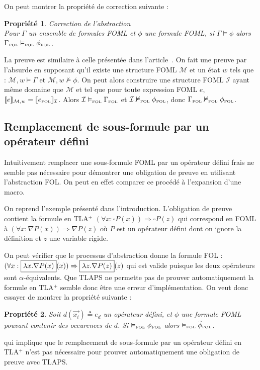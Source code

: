 \documentclass[12pt]{article}
\newcommand{\FOL}{\ensuremath{\textup{\tiny{}FOL}}}
\newcommand{\M}{\ensuremath{\mathcal{M}}}
\newcommand{\I}{\ensuremath{\mathcal{I}}}
\newcommand{\bpar}[1]{\marginpar{\color{myblue}\footnotesize\raggedright#1}}
\newtheorem{prop}{Propriété}
\begin{document}
On peut montrer la propriété de correction suivante :
\begin{prop} \emph{Correction de l'abstraction} \\
  Pour $\Gamma$ un ensemble de formules FOML et $\phi$ une formule FOML, si $\Gamma \vDash \phi$ alors $\Gamma_\FOL \vDash_\FOL \phi_\FOL$.
\end{prop}
La preuve est similaire à celle présentée dans l'article~\cite{ARQNL2014}.
On fait une preuve par l'absurde en supposant qu'il existe une structure FOML $\M$ et un état $w$ tels que :
$\M, w \vDash \Gamma$ et $\M, w \nvDash \phi$.
On peut alors construire une structure FOML $\I$ %
ayant même domaine que $\M$ et tel que pour toute expression FOML $e$, $\llbracket e \rrbracket_{\M, w} = \llbracket e_\FOL \rrbracket_\I$.
Alors $\I \vDash_\FOL \Gamma_\FOL$ et $\I \nvDash_\FOL \phi_\FOL$, donc $\Gamma_\FOL \nvDash_\FOL \phi_\FOL$.


\subsection{Remplacement de sous-formule par un opérateur défini}

Intuitivement remplacer une sous-formule FOML par un opérateur défini frais ne semble pas nécessaire pour démontrer une obligation de preuve en utilisant l'abstraction FOL.
On peut en effet comparer ce procédé à l'expansion d'une macro.

On reprend l'exemple présenté dans l'introduction.
L'obligation de preuve contient la formule en TLA$^+$ %
$(\forall x : \square P(x)) \Rightarrow \square P(z)$ qui correspond en FOML à $(\forall x : \nabla P(x)) \Rightarrow \nabla P(z)$ où $P$ est un opérateur défini dont on ignore la définition et $z$ une variable rigide.

On peut vérifier que le processus d'abstraction donne la formule FOL :
\( (\forall x : \fbox{$\lambda x . \nabla P(x)$}(x)) \Rightarrow \fbox{$\lambda z . \nabla P(z)$}(z) \)
qui est valide puisque les deux opérateurs sont $\alpha$-équivalents.
Que TLAPS ne permette pas de prouver automatiquement la formule en TLA$^+$ semble donc être une erreur d'implémentation.
On veut donc essayer de montrer la propriété suivante :
\begin{prop}
  \label{prop_sem}
Soit $d(\vec{x_i}) \triangleq e_d$ un opérateur défini, et $\phi$ une formule FOML pouvant contenir des occurences de $d$.
Si $\vDash_\FOL \phi_\FOL$ alors $\vDash_\FOL \widetilde{\phi}_\FOL$.
\end{prop}
qui implique que le remplacement de sous-formule par un opérateur défini en TLA$^+$ n'est pas nécessaire pour prouver automatiquement une obligation de preuve avec TLAPS.
\end{document}
